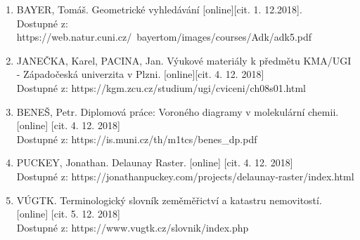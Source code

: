 \documentclass[a4paper, 12pt]{article}
\begin{document}
\begin{enumerate}
\item  BAYER, Tomáš. Geometrické vyhledávání [online][cit. 1. 12.2018]. \\
Dostupné z: https://web.natur.cuni.cz/~bayertom/images/courses/Adk/adk5.pdf  \\

\item JANEČKA, Karel, PACINA, Jan. Výukové materiály k předmětu KMA/UGI - Západočeská univerzita v Plzni. [online][cit. 4. 12. 2018]\\
Dostupné z: https://kgm.zcu.cz/studium/ugi/cviceni/ch08s01.html\\

\item BENEŠ, Petr. Diplomová práce: Voroného diagramy v molekulární chemii. [online] [cit. 4. 12. 2018]\\
Dostupné z: https://is.muni.cz/th/m1tcs/benes\_dp.pdf \\

\item PUCKEY, Jonathan. Delaunay Raster. [online] [cit. 4. 12. 2018]\\
Dostupné z: https://jonathanpuckey.com/projects/delaunay-raster/index.html

\item VÚGTK. Terminologický slovník zeměměřictví a katastru nemovitostí. [online] [cit. 5. 12. 2018]\\
Dostupné z: https://www.vugtk.cz/slovnik/index.php \\



\end{enumerate}
\end{document}
